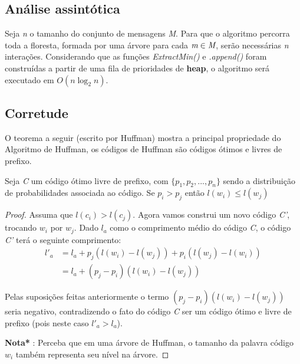\subsection{Análise assintótica}
Seja \emph{n} o tamanho do conjunto de mensagens \emph{M}. Para que o algoritmo percorra toda a floresta, formada por uma árvore para cada $\emph{m} \in \emph{M}$, serão necessárias \emph{n} interações.
Considerando que as funções \emph{ExtractMin()} e \emph{.append()} foram construídas a partir de uma fila de prioridades de \textbf{heap}, o algoritmo será executado em  $O(n \log_2 n)$.

\subsection{Corretude}
O teorema a seguir (escrito por Huffman) mostra a principal propriedade do Algoritmo de Huffman, os códigos de Huffman são códigos ótimos e livres de prefixo.


\begin{lemma} \label{lemma:dist_prob_avg_size} Seja \emph{C} um código ótimo livre de prefixo, com $\{ p_1, p_2,..., p_n\}$ sendo a distribuição de probabilidades associada ao código. Se $p_i > p_j$ então $l(w_i) \leq l(w_j)$

\begin{proof} 
Assuma que $l(c_i) > l(c_j)$. Agora vamos construi um novo código \emph{C'}, trocando $w_i$ por $w_j$. Dado $l_a$ como o comprimento médio do código \emph{C}, o código \emph{C'} terá o seguinte comprimento:
\begin{align*}
l'_a &= l_a + p_j(l(w_i) - l(w_j)) + p_i(l(w_j) - l(w_i)) \\
&= l_a + (p_j - p_i)(l(w_i) - l(w_j)) 
\end{align*}

Pelas suposições feitas anteriormente o termo $(p_j - p_i)(l(w_i) - l(w_j))$ seria negativo, contradizendo o fato do código \emph{C} ser um código ótimo e livre de prefixo (pois neste caso $l'_a > l_a$).

\textbf{Nota*} : Perceba que em uma árvore de Huffman, o tamanho da palavra código $w_i$ também representa seu nível na árvore.
\end{proof}
\end{lemma}

